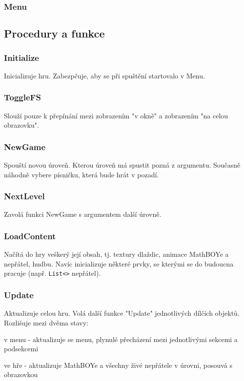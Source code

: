 \documentclass[a4paper,12pt,final]{article}
\begin{document}
\subsubsection{Menu}

\subsection{Procedury a funkce}

\subsubsection{Initialize}

Inicializuje hru. Zabezpčuje, aby se při spuštění startovalo v Menu.

\subsubsection{ToggleFS}

Slouží pouze k přepínání mezi zobrazením "v okně" a zobrazením "na celou obrazovku".

\subsubsection{NewGame}

Spouští novou úroveň. Kterou úroveň má spustit pozná z argumentu. Současně náhodně vybere písničku, která bude hrát v pozadí.

\subsubsection{NextLevel}

Zavolá funkci NewGame s argumentem další úrovně.

\subsubsection{LoadContent}

Načítá do hry veškerý její obsah, tj. textury dlaždic, animace MathBOYe a nepřátel, hudbu. Navíc inicializuje některé prvky, se kterými se do budoucna pracuje (např. \texttt{List<>} nepřátel).

\subsubsection{Update}

Aktualizuje celou hru. Volá další funkce "Update" jednotlivých dílčích objektů. Rozlišuje mezi dvěma stavy:
\begin{compactitem} 
	\item v menu - aktualizuje se menu, plynulé přecházení mezi jednotlivými sekcemi a podsekcemi
	\item ve hře - aktualizuje MathBOYe a všechny živé nepřátele v úrovni, posouvá s obrazovkou
\end{compactitem}
\end{document}
